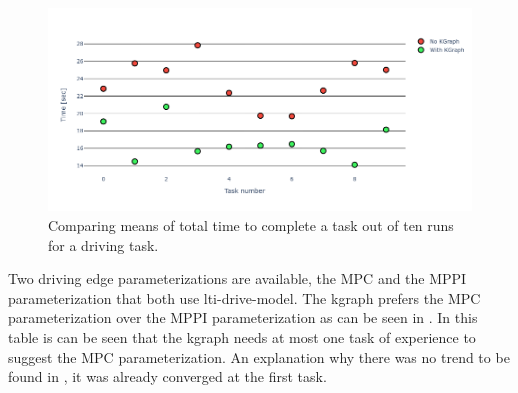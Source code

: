 \begin{figure}[H]
    \centering
    \includegraphics[width=\textwidth]{figures/results/random_drive_time_vs}
    \caption{Comparing means of total time to complete a task out of ten runs for a driving task.}\label{fig:random_drive_time_vs}
\end{figure}

Two driving edge parameterizations are available, the \ac{MPC} and the \ac{MPPI} parameterization that both use lti-drive-model. The \ac{kgraph} prefers the \ac{MPC} parameterization over the \ac{MPPI} parameterization as can be seen in . In this table is can be seen that the \ac{kgraph} needs at most one task of experience to suggest the \ac{MPC} parameterization. An explanation why there was no trend to be found in , it was already converged at the first task.  

